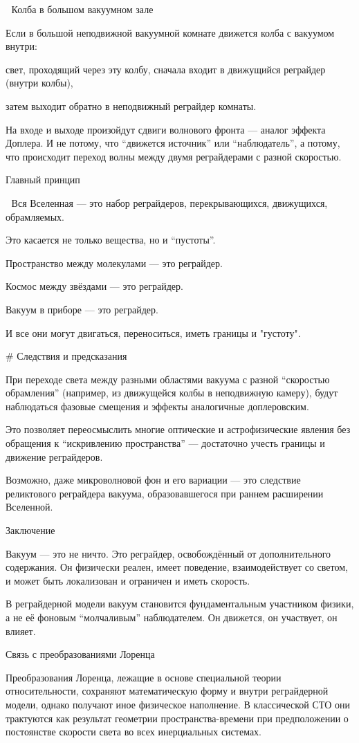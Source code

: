 \documentclass[12pt]{article}
\begin{document}
🧪 Колба в большом вакуумном зале

Если в большой неподвижной вакуумной комнате движется колба с вакуумом внутри:

свет, проходящий через эту колбу, сначала входит в движущийся реграйдер (внутри колбы),

затем выходит обратно в неподвижный реграйдер комнаты.

На входе и выходе произойдут сдвиги волнового фронта — аналог эффекта Доплера. И не потому, что “движется источник” или “наблюдатель”, а потому, что происходит переход волны между двумя реграйдерами с разной скоростью.

Главный принцип

🌌 Вся Вселенная — это набор реграйдеров, перекрывающихся, движущихся, обрамляемых.

Это касается не только вещества, но и “пустоты”.

Пространство между молекулами — это реграйдер.

Космос между звёздами — это реграйдер.

Вакуум в приборе — это реграйдер.

И все они могут двигаться, переноситься, иметь границы и "густоту".

# Следствия и предсказания

При переходе света между разными областями вакуума с разной “скоростью обрамления” (например, из движущейся колбы в неподвижную камеру), будут наблюдаться фазовые смещения и эффекты аналогичные доплеровским.

Это позволяет переосмыслить многие оптические и астрофизические явления без обращения к “искривлению пространства” — достаточно учесть границы и движение реграйдеров.

Возможно, даже микроволновой фон и его вариации — это следствие реликтового реграйдера вакуума, образовавшегося при раннем расширении Вселенной.

Заключение

Вакуум — это не ничто. Это реграйдер, освобождённый от дополнительного содержания. Он физически реален, имеет поведение, взаимодействует со светом, и может быть локализован и ограничен и иметь скорость.

В реграйдерной модели вакуум становится фундаментальным участником физики, а не её фоновым “молчаливым” наблюдателем. Он движется, он участвует, он влияет.


Связь с преобразованиями Лоренца

Преобразования Лоренца, лежащие в основе специальной теории относительности, сохраняют математическую форму и внутри реграйдерной модели, однако получают иное физическое наполнение. В классической СТО они трактуются как результат геометрии пространства-времени при предположении о постоянстве скорости света во всех инерциальных системах.
\end{document}
